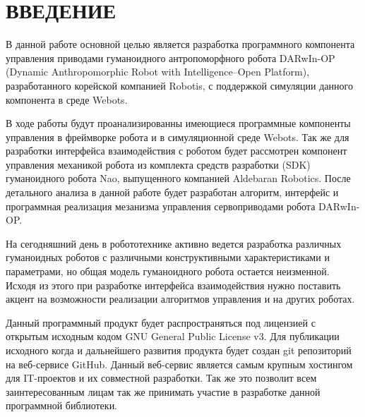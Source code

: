 \chapter*{ВВЕДЕНИЕ}

В данной работе основной целью является разработка программного компонента управления приводами гуманоидного антропоморфного робота DARwIn-OP (Dynamic Anthropomorphic Robot with Intelligence–Open Platform), разработанного корейской компанией  Robotis, с поддержкой симуляции данного компонента в среде Webots.

В ходе работы будут проанализированны имеющиеся программные компоненты управления в фреймворке робота и в симуляционной среде Webots. Так же для разработки интерфейса взаимодействия с роботом будет рассмотрен компонент управления механикой робота из комплекта средств разработки (SDK) гуманоидного робота Nao, выпущенного компанией Aldebaran Robotics. После детального анализа в данной работе будет разработан алгоритм, интерфейс и программная реализация мезанизма управления сервоприводами робота DARwIn-OP.

На сегодняшний день в робототехнике активно ведется разработка различных гуманоидных роботов с различными конструктивными характеристиками и параметрами, но общая модель гуманоидного робота остается неизменной. Исходя из этого при разработке интерфейса взаимодействия нужно поставить акцент на возможности реализации алгоритмов управления и на других роботах.

Данный программный продукт будет распространяться под лицензией с открытым исходным кодом GNU General Public License v3. Для публикации исходного когда и дальнейшего развития продукта будет создан git репозиторий на веб-сервисе GitHub. Данный веб-сервис является самым крупным хостингом для IT-проектов и их совместной разработки. Так же это позволит всем заинтересованным лицам так же принимать участие в разработке данной программной библиотеки.